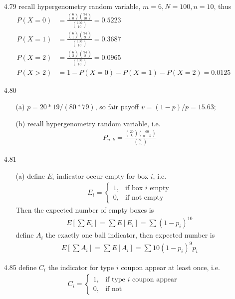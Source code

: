 \documentclass[paper=a4, fontsize=11pt]{scrartcl} %
\numberwithin{equation}{section} %
\numberwithin{figure}{section} %
\numberwithin{table}{section} %
\begin{document}
\begin{itemize}
	\item[4.79] recall hypergenometry random variable, $m=6,N=100,n=10$, thus
	\begin{align}
		P(X=0) &= \frac{{6\choose 0}{94\choose 10}}{{100\choose 10}} = 0.5223 \\
		P(X=1) &= \frac{{6\choose 1}{94\choose 9}}{{100\choose 10}} = 0.3687 \\
		P(X=2) &= \frac{{6\choose 2}{94\choose 8}}{{100\choose 10}} = 0.0965 \\
		P(X>2) &= 1-P(X=0)-P(X=1)-P(X=2) = 0.0125
	\end{align}
	\item[4.80]
	\begin{itemize}
		\item[(a)] $p=20*19/(80*79)$, so fair payoff $v=(1-p)/p = 15.63$;
		\item[(b)] recall hypergenometry random variable, i.e.
		\begin{align}
			P_{n,k} = \frac{{20\choose k}{60\choose n-k}}{{80\choose n}}
		\end{align}
	\end{itemize}
	\item[4.81]
	\begin{itemize}
		\item[(a)] define $E_i$ indicator occur empty for box $i$, i.e.
		\begin{align}
			E_i = \begin{cases} 1, &\mbox{if box $i$ empty} \\ 0, &\mbox{if not empty}\end{cases}
		\end{align}
		Then the expected number of empty boxes is
		\begin{align}
			E[\sum E_i] = \sum E[E_i] =\sum (1-p_i)^{10}
		\end{align}
		define $A_i$ the exactly one ball indicator, then expected number is
		\begin{align}
			E[\sum A_i] = \sum E[A_i] =\sum 10(1-p_i)^9p_i
		\end{align}
	\end{itemize}
	\item[4.85] define $C_i$ the indicator for type $i$ coupon appear at least once, i.e.
	\begin{align}
		C_i = \begin{cases} 1, &\mbox{if type $i$ coupon appear} \\ 0, &\mbox{if not}\end{cases}
	\end{align}

\end{itemize}
\end{document}
